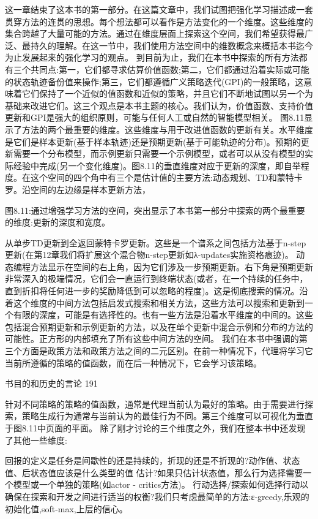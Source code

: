 这一章结束了这本书的第一部分。在这篇文章中，我们试图把强化学习描述成一套贯穿方法的连贯的思想。每个想法都可以看作是方法变化的一个维度。这些维度的集合跨越了大量可能的方法。通过在维度层面上探索这个空间，我们希望获得最广泛、最持久的理解。在这一节中，我们使用方法空间中的维数概念来概括本书迄今为止发展起来的强化学习的观点。
到目前为止，我们在本书中探索的所有方法都有三个共同点:第一，它们都寻求估算价值函数;第二，它们都通过沿着实际或可能的状态轨迹备份值来操作;第三，它们都遵循广义策略迭代(GPI)的一般策略，这意味着它们保持了一个近似的值函数和近似的策略，并且它们不断地试图以另一个为基础来改进它们。这三个观点是本书主题的核心。我们认为，价值函数、支持价值更新和GPI是强大的组织原则，可能与任何人工或自然的智能模型相关。
图8.11显示了方法的两个最重要的维度。这些维度与用于改进值函数的更新有关。水平维度是它们是样本更新(基于样本轨迹)还是预期更新(基于可能轨迹的分布)。预期的更新需要一个分布模型，而示例更新只需要一个示例模型，或者可以从没有模型的实际经验中完成(另一个变化维度)。图8.11的垂直维度对应于更新的深度，即自举程度。在这个空间的四个角中有三个是估计值的主要方法:动态规划、TD和蒙特卡罗。沿空间的左边缘是样本更新方法，

 
 

图8.11:通过增强学习方法的空间，突出显示了本书第一部分中探索的两个最重要的维度:更新的深度和宽度。



从单步TD更新到全返回蒙特卡罗更新。这些是一个谱系之间包括方法基于n-step更新(在第12章我们将扩展这个混合物n-step更新如λ-updates实施资格痕迹)。
动态编程方法显示在空间的右上角，因为它们涉及一步预期更新。右下角是预期更新非常深入的极端情况，它们会一直运行到终端状态(或者，在一个持续的任务中，直到折扣将任何进一步的奖励降低到可以忽略的程度)。这是彻底搜索的情况。沿着这个维度的中间方法包括启发式搜索和相关方法，这些方法可以搜索和更新到一个有限的深度，可能是有选择性的。也有一些方法是沿着水平维度的中间的。这些包括混合预期更新和示例更新的方法，以及在单个更新中混合示例和分布的方法的可能性。正方形的内部填充了所有这些中间方法的空间。
我们在本书中强调的第三个方面是政策方法和政策方法之间的二元区别。在前一种情况下，代理将学习它当前所遵循的策略的值函数，而在后一种情况下，它会学习该策略。

书目的和历史的言论 					191



针对不同策略的策略的值函数，通常是代理当前认为最好的策略。由于需要进行探索，策略生成行为通常与当前认为的最佳行为不同。第三个维度可以可视化为垂直于图8.11中页面的平面。
除了刚才讨论的三个维度之外，我们在整本书中还发现了其他一些维度:

回报的定义是任务是间歇性的还是持续的，折现的还是不折现的?动作值、状态值、后状态值应该是什么类型的值
估计?如果只估计状态值，那么行为选择需要一个模型或一个单独的策略(如actor - critics方法)。
行动选择/探索如何选择行动以确保在探索和开发之间进行适当的权衡?我们只考虑最简单的方法:ε-greedy,乐观的初始化值,soft-max,上层的信心。

